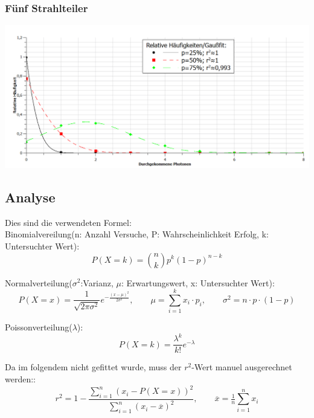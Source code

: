 \subsubsection{Fünf Strahlteiler}

\begin{center}
	\includegraphics{IMAGE/5ST}
\end{center}
\clearpage
\subsection{Analyse}
 
 Dies sind die verwendeten Formel:\\
 
 Binomialvereilung(n: Anzahl Versuche, P: Wahrscheinlichkeit Erfolg, k: Untersuchter Wert):\\
\begin{equation*}
 	P(X= k) = \binom{n}{k}p^k(1-p)^{n-k}
\end{equation*}

Normalverteilung($\sigma^2$:Varianz, $\mu$: Erwartungswert, x: Untersuchter Wert):\\
\begin{equation*}
	P(X= x) = \frac{1}{\sqrt{2\pi\sigma^2}}e^{-\frac{(x-\mu)^2}{2\sigma^2}},\qquad \mu = \sum_{i=1}^k x_i\cdot p_i, \qquad \sigma^2 = n\cdot p \cdot(1-p)
\end{equation*}

Poissonverteilung($\lambda$):\\
\begin{equation*}
	P(X=k)= \frac{\lambda^k}{k!}e^{-\lambda}
\end{equation*}

Da im folgendem nicht gefittet wurde, muss der $r^2$-Wert manuel ausgerechnet werden::\\
\begin{equation*}
	r^2 = 1- \frac{\sum_{i=1}^n(x_i-P(X=x))^2}{\sum_{i=1}^n(x_i-\overline{x})^2}, \qquad \overline{x}=\tfrac{1}{n}\sum_{i=1}^n x_i
\end{equation*}


